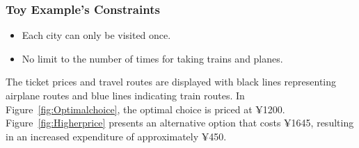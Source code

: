 \documentclass{article}
\begin{document}
\subsubsection{Toy Example's Constraints}
\begin{itemize}
  \item Each city can only be visited once.
  \item No limit to the number of times for taking trains and planes.
\end{itemize}

The ticket prices and travel routes are displayed with black lines representing airplane routes and blue lines indicating train routes. In Figure~\ref{fig:Optimalchoice}, the optimal choice is priced at ¥1200. Figure~\ref{fig:Higherprice} presents an alternative option that costs ¥1645, resulting in an increased expenditure of approximately ¥450.
\end{document}
